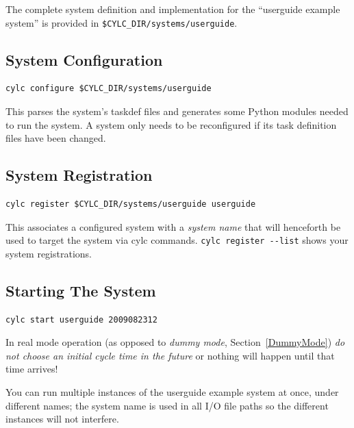 \documentclass[11pt,a4paper]{article}
\begin{document}
The complete system definition and implementation for the ``userguide
example system'' is provided in \lstinline=$CYLC_DIR/systems/userguide=. 


   
\subsection{System Configuration}
\label{QuickSystemConfiguration}

\begin{lstlisting}
cylc configure $CYLC_DIR/systems/userguide
\end{lstlisting}

This parses the system's taskdef files and generates some Python modules
needed to run the system. A system only needs to be reconfigured if its
task definition files have been changed.

\subsection{System Registration}
\label{QuickSystemRegistration}

\begin{lstlisting}
cylc register $CYLC_DIR/systems/userguide userguide 
\end{lstlisting}

This associates a configured system with a {\em system name} that will
henceforth be used to target the system via cylc commands. 
\lstinline=cylc register --list= shows your system registrations.

\subsection{Starting The System}
\label{QuickStartingTheSystem}

\begin{lstlisting}
cylc start userguide 2009082312
\end{lstlisting}


In real mode operation (as opposed to {\em dummy mode},
Section~\ref{DummyMode}) {\em do not choose an initial cycle time in the
future} or nothing will happen until that time arrives!

You can run multiple instances of the userguide example system at once,
under different names; the system name is used in all I/O file paths so
the different instances will not interfere. 
\end{document}
